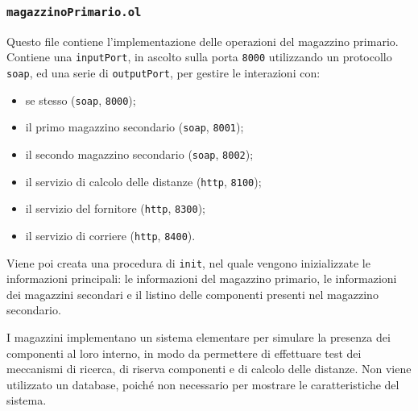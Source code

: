 \subsubsection*{\tt magazzinoPrimario.ol}
Questo file contiene l'implementazione delle operazioni del magazzino
primario. Contiene una {\tt inputPort}, in ascolto sulla porta {\tt 8000}
utilizzando un protocollo {\tt soap}, ed una serie di {\tt outputPort},
per gestire le interazioni con:
\begin{itemize}
  \item se stesso ({\tt soap}, {\tt 8000});
  \item il primo magazzino secondario ({\tt soap}, {\tt 8001});
  \item il secondo magazzino secondario ({\tt soap}, {\tt 8002});
  \item il servizio di calcolo delle distanze ({\tt http}, {\tt 8100});
  \item il servizio del fornitore ({\tt http}, {\tt 8300});
  \item il servizio di corriere ({\tt http}, {\tt 8400}).
\end{itemize}
Viene poi creata una procedura di {\tt init}, nel quale vengono
inizializzate le informazioni principali: le informazioni del magazzino
primario, le informazioni dei magazzini secondari e il listino delle
componenti presenti nel magazzino secondario.

I magazzini implementano un sistema elementare per simulare la presenza
dei componenti al loro interno, in modo da permettere di effettuare test
dei meccanismi di ricerca, di riserva componenti e di calcolo delle
distanze. Non viene utilizzato un database, poich\'e non necessario per
mostrare le caratteristiche del sistema.

